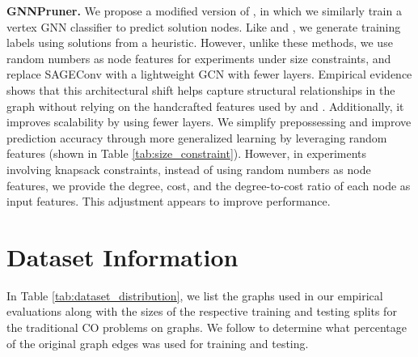 


\textbf{GNNPruner.} We propose a modified version of \comb, in which we similarly train a vertex GNN classifier to predict solution nodes. Like \comb and \lense, we generate training labels using solutions from  a heuristic. However, unlike these methods, we use random numbers as node features for experiments under size constraints, and replace SAGEConv \citep{hamilton2017inductive} with a lightweight GCN \citep{kipf2016semi} with fewer layers. Empirical evidence shows that this architectural shift helps capture structural relationships in the graph without relying on the handcrafted features used by \comb and \lense. Additionally, it improves scalability by using fewer layers. We simplify prepossessing and improve prediction accuracy through more generalized learning by leveraging random features (shown in Table \ref{tab:size_constraint}). However, in experiments involving knapsack constraints, instead of using random numbers as node features, we provide the degree, cost, and the degree-to-cost ratio of each node as input features. This adjustment appears to improve performance.
\section{Dataset Information} \label{appendix:dataset}

In Table \ref{tab:dataset_distribution}, we list the graphs used in our empirical evaluations along with the sizes of the respective training and testing splits for the traditional CO problems on graphs. We follow \citet{ireland2022lense} to determine what percentage of the original graph edges was used for training and testing.

